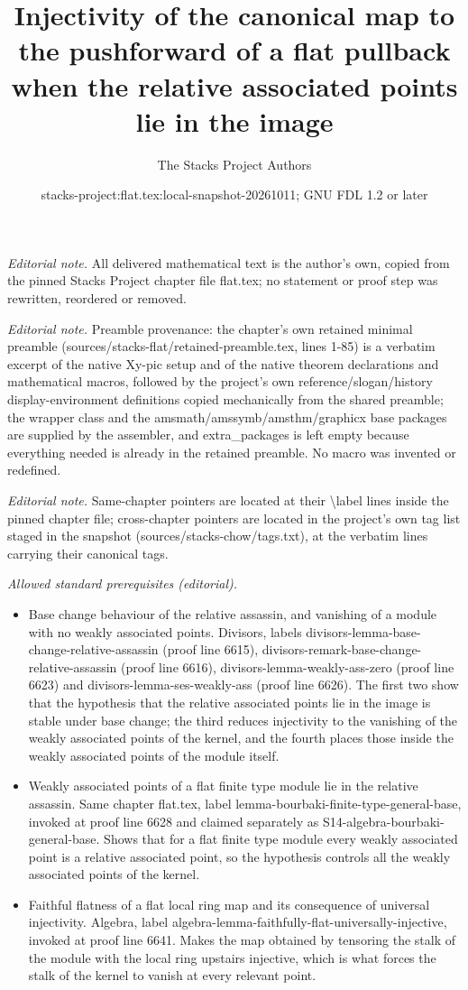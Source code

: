 \documentclass[10pt,a4paper]{amsart}
\title{Injectivity of the canonical map to the pushforward of a flat pullback when the relative associated points lie in the image}
\author{The Stacks Project Authors}
\date{stacks-project:flat.tex:local-snapshot-20261011; GNU FDL 1.2 or later}
\theoremstyle{plain}
\theoremstyle{definition}
\theoremstyle{remark}
\numberwithin{equation}{subsection}
\begin{document}
\maketitle
\noindent\textit{Editorial note.} All delivered mathematical text is the author's own, copied from the pinned Stacks Project chapter file flat.tex; no statement or proof step was rewritten, reordered or removed.\par\medskip
\noindent\textit{Editorial note.} Preamble provenance: the chapter's own retained minimal preamble (sources/stacks-flat/retained-preamble.tex, lines 1-85) is a verbatim excerpt of the native Xy-pic setup and of the native theorem declarations and mathematical macros, followed by the project's own reference/slogan/history display-environment definitions copied mechanically from the shared preamble; the wrapper class and the amsmath/amssymb/amsthm/graphicx base packages are supplied by the assembler, and extra\_packages is left empty because everything needed is already in the retained preamble. No macro was invented or redefined.\par\medskip
\noindent\textit{Editorial note.} Same-chapter pointers are located at their \textbackslash{}label lines inside the pinned chapter file; cross-chapter pointers are located in the project's own tag list staged in the snapshot (sources/stacks-chow/tags.txt), at the verbatim lines carrying their canonical tags.\par\medskip
\noindent\textit{Allowed standard prerequisites (editorial).}\begin{itemize}
\item Base change behaviour of the relative assassin, and vanishing of a module with no weakly associated points. Divisors, labels divisors-lemma-base-change-relative-assassin (proof line 6615), divisors-remark-base-change-relative-assassin (proof line 6616), divisors-lemma-weakly-ass-zero (proof line 6623) and divisors-lemma-ses-weakly-ass (proof line 6626). The first two show that the hypothesis that the relative associated points lie in the image is stable under base change; the third reduces injectivity to the vanishing of the weakly associated points of the kernel, and the fourth places those inside the weakly associated points of the module itself.
\item Weakly associated points of a flat finite type module lie in the relative assassin. Same chapter flat.tex, label lemma-bourbaki-finite-type-general-base, invoked at proof line 6628 and claimed separately as S14-algebra-bourbaki-general-base. Shows that for a flat finite type module every weakly associated point is a relative associated point, so the hypothesis controls all the weakly associated points of the kernel.
\item Faithful flatness of a flat local ring map and its consequence of universal injectivity. Algebra, label algebra-lemma-faithfully-flat-universally-injective, invoked at proof line 6641. Makes the map obtained by tensoring the stalk of the module with the local ring upstairs injective, which is what forces the stalk of the kernel to vanish at every relevant point.
\end{itemize}\medskip
\end{document}
